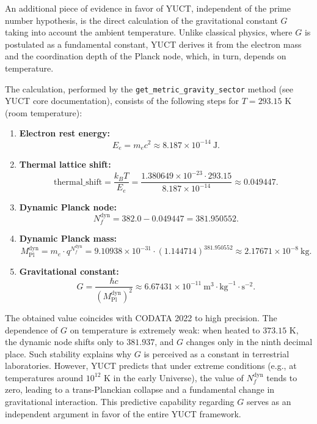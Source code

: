 \documentclass[11pt,a4paper]{article}
\begin{document}
	An additional piece of evidence in favor of YUCT, independent of the prime number hypothesis, is the direct calculation of the gravitational constant $G$ taking into account the ambient temperature. Unlike classical physics, where $G$ is postulated as a fundamental constant, YUCT derives it from the electron mass and the coordination depth of the Planck node, which, in turn, depends on temperature.
	
	The calculation, performed by the \texttt{get\_metric\_gravity\_sector} method (see YUCT core documentation), consists of the following steps for $T = 293.15$ K (room temperature):
	
	\begin{enumerate}
		\item \textbf{Electron rest energy:}
		\begin{equation}
			E_e = m_e c^2 \approx 8.187 \times 10^{-14}~\text{J}.
		\end{equation}
		\item \textbf{Thermal lattice shift:}
		\begin{equation}
			\text{thermal\_shift} = \frac{k_B T}{E_e} = \frac{1.380649 \times 10^{-23} \cdot 293.15}{8.187 \times 10^{-14}} \approx 0.049447.
		\end{equation}
		\item \textbf{Dynamic Planck node:}
		\begin{equation}
			N_f^{\text{dyn}} = 382.0 - 0.049447 = 381.950552.
		\end{equation}
		\item \textbf{Dynamic Planck mass:}
		\begin{equation}
			M_{\text{Pl}}^{\text{dyn}} = m_e \cdot q^{N_f^{\text{dyn}}} = 9.10938 \times 10^{-31} \cdot (1.144714)^{381.950552} \approx 2.17671 \times 10^{-8}~\text{kg}.
		\end{equation}
		\item \textbf{Gravitational constant:}
		\begin{equation}
			G = \frac{\hbar c}{(M_{\text{Pl}}^{\text{dyn}})^2} \approx 6.67431 \times 10^{-11}~\text{m}^3\!\cdot\!\text{kg}^{-1}\!\cdot\!\text{s}^{-2}.
		\end{equation}
	\end{enumerate}
	
	The obtained value coincides with CODATA 2022 to high precision. The dependence of $G$ on temperature is extremely weak: when heated to $373.15$ K, the dynamic node shifts only to $381.937$, and $G$ changes only in the ninth decimal place. Such stability explains why $G$ is perceived as a constant in terrestrial laboratories. However, YUCT predicts that under extreme conditions (e.g., at temperatures around $10^{12}$ K in the early Universe), the value of $N_f^{\text{dyn}}$ tends to zero, leading to a trans-Planckian collapse and a fundamental change in gravitational interaction. This predictive capability regarding $G$ serves as an independent argument in favor of the entire YUCT framework.
	
\end{document}
